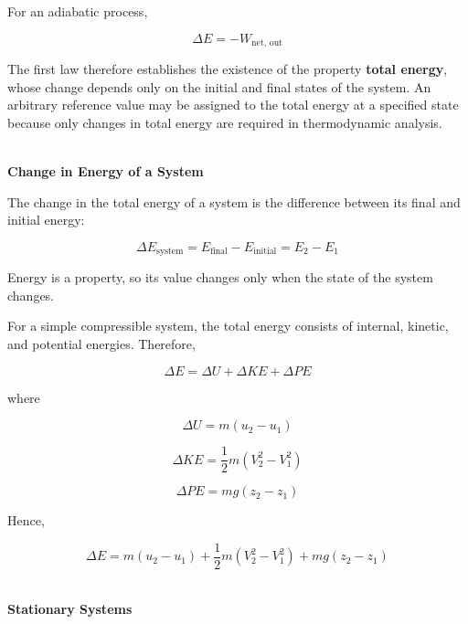 \documentclass[12pt]{article}
\begin{document}
For an adiabatic process,

\begin{equation*}
\Delta E = - W_{\mathrm{net, \, out}}
\end{equation*}

The first law therefore establishes the existence of the property \textbf{total energy}, whose change depends only on the initial and final states of the system. An arbitrary reference value may be assigned to the total energy at a specified state because only changes in total energy are required in thermodynamic analysis. 

\textbf{\\ Change in Energy of a System}

The change in the total energy of a system is the difference between its final and initial energy:

\begin{equation*}
\Delta E_{\mathrm{system}}
=
E_{\mathrm{final}}-E_{\mathrm{initial}}
=
E_2-E_1
\end{equation*}

Energy is a property, so its value changes only when the state of the system changes.

For a simple compressible system, the total energy consists of internal, kinetic, and potential energies. Therefore,

\begin{equation*}
\Delta E
=
\Delta U+\Delta KE+\Delta PE
\end{equation*}

where

\begin{equation*}
\Delta U=m(u_2-u_1)
\end{equation*}

\begin{equation*}
\Delta KE
=
\frac{1}{2}m(V_2^2-V_1^2)
\end{equation*}

\begin{equation*}
\Delta PE
=
mg(z_2-z_1)
\end{equation*}

Hence,

\begin{equation*}
\Delta E
=
m(u_2-u_1)
+
\frac{1}{2}m(V_2^2-V_1^2)
+
mg(z_2-z_1)
\end{equation*}



\textbf{\\ Stationary Systems}
\end{document}
